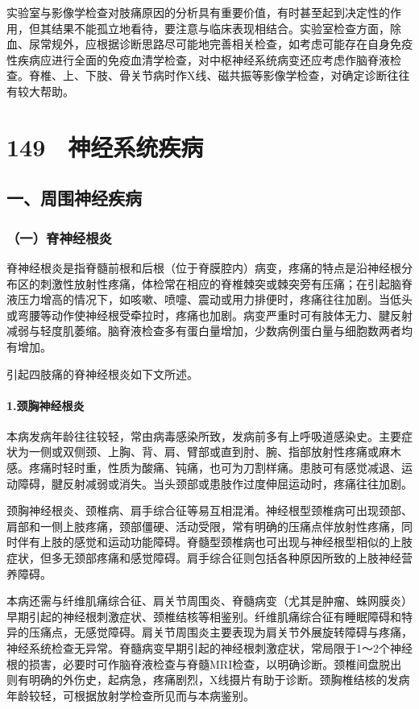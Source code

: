 实验室与影像学检查对肢痛原因的分析具有重要价值，有时甚至起到决定性的作用，但其结果不能孤立地看待，要注意与临床表现相结合。实验室检查方面，除血、尿常规外，应根据诊断思路尽可能地完善相关检查，如考虑可能存在自身免疫性疾病应进行全面的免疫血清学检查，对中枢神经系统病变还应考虑作脑脊液检查。脊椎、上、下肢、骨关节病时作X线、磁共振等影像学检查，对确定诊断往往有较大帮助。

\protect\hypertarget{text00339.html}{}{}

\section{149　神经系统疾病}

\subsection{一、周围神经疾病}

\subsubsection{（一）脊神经根炎}

脊神经根炎是指脊髓前根和后根（位于脊膜腔内）病变，疼痛的特点是沿神经根分布区的刺激性放射性疼痛，体检常在相应的脊椎棘突或棘突旁有压痛；在引起脑脊液压力增高的情况下，如咳嗽、喷嚏、震动或用力排便时，疼痛往往加剧。当低头或弯腰等动作使神经根受牵拉时，疼痛也加剧。病变严重时可有肢体无力、腱反射减弱与轻度肌萎缩。脑脊液检查多有蛋白量增加，少数病例蛋白量与细胞数两者均有增加。

引起四肢痛的脊神经根炎如下文所述。

\paragraph{1.颈胸神经根炎}

本病发病年龄往往较轻，常由病毒感染所致，发病前多有上呼吸道感染史。主要症状为一侧或双侧颈、上胸、背、肩、臂部或直到肘、腕、指部放射性疼痛或麻木感。疼痛时轻时重，性质为酸痛、钝痛，也可为刀割样痛。患肢可有感觉减退、运动障碍，腱反射减弱或消失。当头颈部或患肢作过度伸屈运动时，疼痛往往加剧。

颈胸神经根炎、颈椎病、肩手综合征等易互相混淆。神经根型颈椎病可出现颈部、肩部和一侧上肢疼痛，颈部僵硬、活动受限，常有明确的压痛点伴放射性疼痛，同时伴有上肢的感觉和运动功能障碍。脊髓型颈椎病也可出现与神经根型相似的上肢症状，但多无颈部疼痛和感觉障碍。肩手综合征则包括各种原因所致的上肢神经营养障碍。

本病还需与纤维肌痛综合征、肩关节周围炎、脊髓病变（尤其是肿瘤、蛛网膜炎）早期引起的神经根刺激症状、颈椎结核等相鉴别。纤维肌痛综合征有睡眠障碍和特异的压痛点，无感觉障碍。肩关节周围炎主要表现为肩关节外展旋转障碍与疼痛，神经系统检查无异常。脊髓病变早期引起的神经根刺激症状，常局限于1～2个神经根的损害，必要时可作脑脊液检查与脊髓MRI检查，以明确诊断。颈椎间盘脱出则有明确的外伤史，起病急，疼痛剧烈，X线摄片有助于诊断。颈胸椎结核的发病年龄较轻，可根据放射学检查所见而与本病鉴别。

